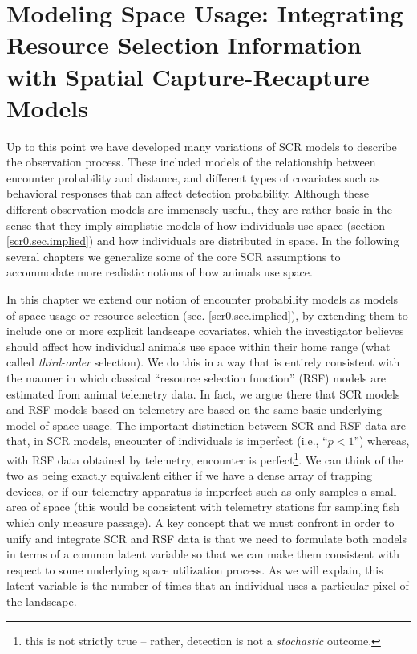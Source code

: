 \chapter{
Modeling Space Usage:
Integrating Resource Selection Information with
Spatial Capture-Recapture
  Models}

\label{chapt.rsf}


\vspace{.3in}

Up to this point we have developed many variations of
SCR models to describe the observation process. 
These included models of the relationship between encounter
probability and distance, and different types of covariates such as 
behavioral responses 
that can affect detection
probability. 
Although these different observation models are immensely useful, they
are rather basic in the sense
that they imply simplistic models of how individuals use space
(section \ref{scr0.sec.implied}) and how individuals are distributed
in space.  In the following several chapters we generalize some of the
core SCR assumptions to accommodate more realistic notions of how
animals use space.

In this chapter we extend our notion of encounter probability models
as models of space usage or resource selection
(sec. \ref{scr0.sec.implied}), by extending them to include one or
more explicit landscape covariates, which the investigator believes
should affect how individual animals use space within their home range
(what \citep{johnson:1980} called {\it third-order} selection). We do this in a way
that is entirely consistent with the manner in which classical
``resource selection function'' (RSF) models are estimated from animal
telemetry data.  In fact, we argue there that SCR models and RSF
models based on telemetry are based on the same basic underlying model
of space usage. The important distinction between SCR and RSF data are
that, in SCR models, encounter of individuals is imperfect (i.e.,
``$p<1$'') whereas, with RSF data obtained by telemetry, encounter is
perfect\footnote{this is not strictly true -- rather, detection is not
  a {\it stochastic} outcome.}. We can think of the two as being
exactly equivalent either if we have a dense array of trapping
devices, or if our telemetry apparatus is imperfect such as only
samples a small area of space (this would be consistent with telemetry
stations for sampling fish which only measure passage).  A key concept
that we must confront in order to unify and integrate SCR and RSF data
is that we need to formulate both models in terms of a common latent
variable so that we can make them consistent with respect to some
underlying space utilization process. As we will explain, this latent
variable is the number of times that an individual uses a 
particular pixel of the landscape.

